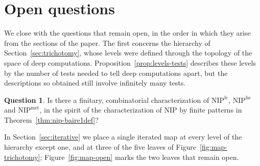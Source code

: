\documentclass[psamsfonts]{amsart}
\theoremstyle{definition}
\newtheorem{question}[thm]{Question}
\theoremstyle{remark}
\newcommand{\NIP}{\text{NIP}}
\numberwithin{equation}{section}
\begin{document}
\section{Open questions}
\label{sec:open-questions}

We close with the questions that remain open, in the order in which they arise from the sections of the paper.
The first concerns the hierarchy of Section~\ref{sec:trichotomy}, whose levels were defined through the topology of the space of deep computations.
Proposition~\ref{prop:levels-tests} describes these levels by the number of tests needed to tell deep computations apart, but the descriptions so obtained still involve infinitely many tests.

\begin{question}\label{q:NIP-levels}
  Is there a finitary, combinatorial characterization of $\NIP^{\mathrm{fc}}$, $\NIP^{\mathrm{hs}}$ and $\NIP^{\mathrm{met}}$, in the spirit of the characterization of $\NIP$ by finite patterns in Theorem~\ref{thm:nip-baire1def}?
\end{question}

In Section~\ref{sec:iterative} we place a single iterated map at every level of the hierarchy except one, and at three of the five leaves of Figure~\ref{fig:map-trichotomy}; Figure~\ref{fig:map-open} marks the two leaves that remain open.
\end{document}
